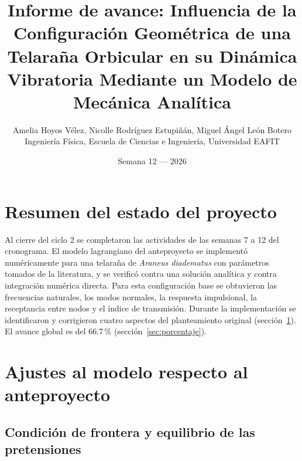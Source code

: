 \documentclass[11pt,letterpaper]{article}
\title{\textbf{\LARGE Informe de avance: Influencia de la Configuración Geométrica
de una Telaraña Orbicular en su Dinámica Vibratoria
Mediante un Modelo de Mecánica Analítica}}
\author{Amelia Hoyos Vélez, Nicolle Rodríguez Estupiñán, Miguel Ángel León Botero\\[0.3cm]
\small Ingeniería Física, Escuela de Ciencias e Ingeniería, Universidad EAFIT}
\date{Semana 12 --- 2026}
\begin{document}
\maketitle

\section*{Resumen del estado del proyecto}
Al cierre del ciclo 2 se completaron las actividades de las semanas 7 a 12
del cronograma. El modelo lagrangiano del anteproyecto se implementó
numéricamente para una telaraña de \textit{Araneus diadematus} con
parámetros tomados de la literatura, y se verificó contra una solución
analítica y contra integración numérica directa. Para esta configuración
base se obtuvieron las frecuencias naturales, los modos normales, la
respuesta impulsional, la receptancia entre nodos y el índice de
transmisión. Durante la implementación se identificaron y corrigieron
cuatro aspectos del planteamiento original (sección~\ref{sec:ajustes}).
El avance global es del 66.7\,\% (sección~\ref{sec:porcentaje}).

\section{Ajustes al modelo respecto al anteproyecto}\label{sec:ajustes}

\subsection{Condición de frontera y equilibrio de las pretensiones}
\end{document}
